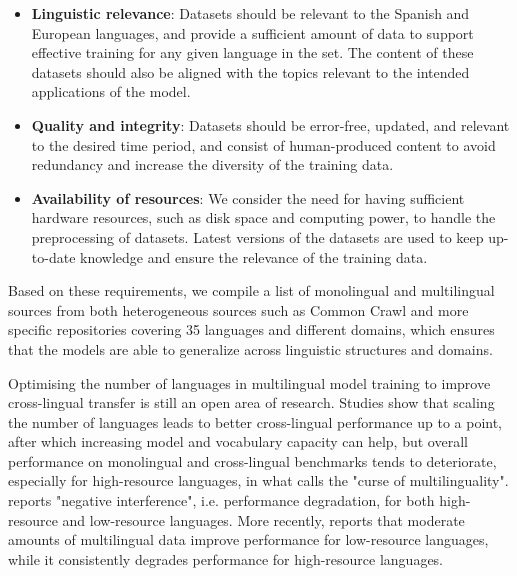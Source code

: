 \begin{itemize}
     \item \textbf{Linguistic relevance}: Datasets should be relevant to the Spanish and European languages, and provide a sufficient amount of data to support effective training for any given language in the set. The content of these datasets should also be aligned with the topics relevant to the intended applications of the model.
     \item \textbf{Quality and integrity}: Datasets should be error-free, updated, and relevant to the desired time period, and consist of human-produced content to avoid redundancy and increase the diversity of the training data.
     \item \textbf{Availability of resources}: We consider the need for having sufficient hardware resources, such as disk space and computing power, to handle the preprocessing of datasets. Latest versions of the datasets are used to keep up-to-date knowledge and ensure the relevance of the training data.
\end{itemize}


Based on these requirements, we compile a list of monolingual and multilingual sources from both heterogeneous sources such as Common Crawl and more specific repositories covering 35 languages and different domains, which ensures that the models are able to generalize across linguistic structures and domains.

Optimising the number of languages in multilingual model training to improve cross-lingual transfer is still an open area of research. Studies show that scaling the number of languages leads to better cross-lingual performance up to a point, after which increasing model and vocabulary capacity can help, but overall performance on monolingual and cross-lingual benchmarks tends to deteriorate, especially for high-resource languages, in what \citet{conneau_unsupervised_2020} calls the "curse of multilinguality". \citet{wang_negative_2020} reports "negative interference", i.e. performance degradation, for both high-resource and low-resource languages. More recently, \citet{chang_when_2023} reports that moderate amounts of multilingual data improve performance for low-resource languages, while it consistently degrades performance for high-resource languages.

